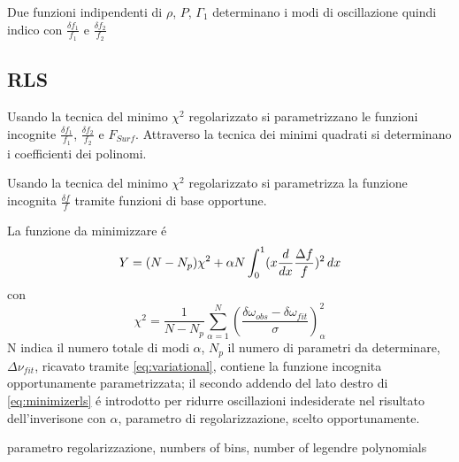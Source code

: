 \documentclass[../main.tex]{subfiles}
\begin{document}
\begin{workout}

Due funzioni indipendenti di $\rho$, $P$, $\Gamma_1$ determinano i modi di oscillazione quindi indico con $\frac{\delta f_1}{f_1}$ e $\frac{\delta f_2}{f_2}$

\end{workout}

\subsection{RLS}

\begin{workout}

Usando la tecnica del minimo $\chi^2$ regolarizzato si parametrizzano le funzioni incognite $\frac{\delta f_1}{f_1}$, $\frac{\delta f_2}{f_2}$ e $F_{Surf}$. Attraverso la tecnica dei minimi quadrati si determinano i coefficienti dei polinomi.

\end{workout}

Usando la tecnica del minimo $\chi^2$ regolarizzato si parametrizza la funzione incognita $\frac{\delta f}{f}$ tramite funzioni di base opportune.

La funzione da minimizzare \'e
\begin{equation}
Y=(N-N_p)\chi^2+\alpha N\int_0^1(x\frac{d}{d x}\frac{\Delta f}{f})^2\,dx\label{eq:minimizerls}
\end{equation}
con
\begin{equation}
\chi^2=\frac{1}{N-N_p}\sum_{\alpha=1}^N(\frac{\delta\omega_{obs}-\delta\omega_{fit}}{\sigma})^2_{\alpha}
\end{equation}
N indica il numero totale di modi $\alpha$, $N_p$ il numero di parametri da determinare, $\Delta\nu_{fit}$, ricavato tramite \eqref{eq:variational}, contiene la funzione incognita opportunamente parametrizzata; il secondo addendo del lato destro di \eqref{eq:minimizerls} \'e introdotto per ridurre oscillazioni indesiderate nel risultato dell'inverisone con $\alpha$, parametro di regolarizzazione, scelto opportunamente.

\begin{workout}
parametro regolarizzazione, numbers of bins, number of legendre polynomials
\end{workout}
\end{document}
